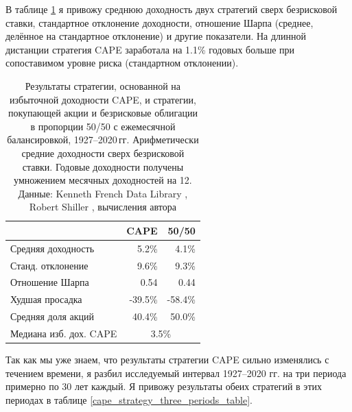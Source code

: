 В таблице \ref{cape_strategy_1927_table} я привожу среднюю доходность двух 
стратегий сверх безрисковой ставки, стандартное отклонение доходности, 
отношение Шарпа (среднее, делённое на стандартное отклонение) и другие 
показатели. На длинной дистанции стратегия CAPE заработала на 1.1\% годовых 
больше при сопоставимом уровне риска (стандартном отклонении).

\begin{table}[h!]
\centering
\begin{tabular}{l|r|r}
                       & CAPE    & 50/50   \\ \hline
Средняя доходность     &   5.2\% &   4.1\% \\
Станд. отклонение      &   9.6\% &   9.3\% \\
Отношение Шарпа        &   0.54  &   0.44  \\
Худшая просадка        & -39.5\% & -58.4\% \\
Средняя доля акций     &  40.4\% &  50.0\% \\
\cline{2-3}
Медиана изб. дох. CAPE & \multicolumn{2}{c}{3.5\%}
\end{tabular}
\caption{Результаты стратегии, основанной на избыточной доходности CAPE, и 
стратегии, покупающей акции и безрисковые облигации в пропорции 50/50 с 
ежемесячной балансировкой, 1927--2020\,гг.
Арифметически средние доходности сверх безрисковой ставки.
Годовые доходности получены умножением месячных доходностей на 12.
Данные: Kenneth French Data Library 
\cite{kennethFrench}, Robert Shiller \cite{shillerOnline}, вычисления автора}
\label{cape_strategy_1927_table}
\end{table}

Так как мы уже знаем, что результаты стратегии CAPE сильно изменялись с 
течением времени, я разбил исследуемый интервал 1927--2020 гг. на три периода 
примерно по 30 лет каждый. Я привожу результаты обеих стратегий в этих 
периодах в таблице \ref{cape_strategy_three_periods_table}.

